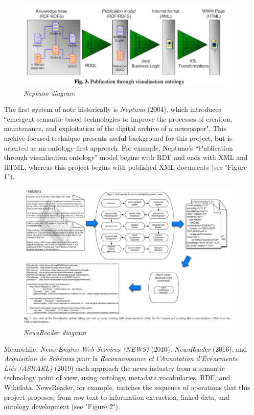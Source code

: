 \documentclass[11pt]{article}
\begin{document}
\begin{figure}
  \centerline{\includegraphics[scale=0.4]{literature-review--neptuno.png}}
  \caption{\textit{Neptuno diagram}}
\end{figure}

The first system of note historically is \textit{Neptuno} (2004)\cite{castells2004neptuno}, which introduces ``emergent semantic-based technologies to improve the processes of creation, maintenance, and exploitation of the digital archive of a newspaper". This archive-focused technique presents useful background for this project, but is oriented as an ontology-first approach. For example, Neptuno's ``Publication through visualisation ontology" model begins with RDF and ends with XML and HTML, whereas this project begins with published XML documents (see "Figure 1").

\begin{figure}
  \centerline{\includegraphics[scale=0.4]{literature-review--newsreader.png}}
  \caption{\textit{NewsReader diagram}}
\end{figure}

Meanwhile, \textit{News Engine Web Services (NEWS)} \cite{fernandez2010news} (2010), \textit{NewsReader} \cite{vossen2016newsreader} (2016), and \textit{Acquisition de Schémas pour la Reconnaissance et l'Annotation d'Événements Liés (ASRAEL)} \cite{rudnik2019searching} (2019) each approach the news industry from a semantic technology point of view, using ontology, metadata vocabularies, RDF, and Wikidata. NewsReader, for example, matches the sequence of operations that this project proposes, from raw text to information extraction, linked data, and ontology development (see "Figure 2").
\end{document}
